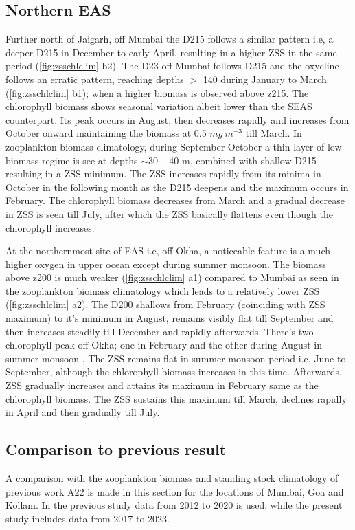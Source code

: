 \documentclass{article}
\begin{document}
	\subsection{Northern EAS}
	Further north of Jaigarh, off Mumbai the D215 follows a similar pattern i.e, a deeper D215 in December to early April, resulting in a higher ZSS in the same period (\cref{fig:zsschlclim} b2). The D23 off Mumbai follows D215 and the oxycline follows an erratic pattern, reaching depths $>$ 140 during January to March (\cref{fig:zsschlclim} b1); when a higher biomass is observed above z215. The chlorophyll biomass shows seasonal variation albeit lower than the SEAS counterpart. Its peak occurs in August, then decreases rapidly and increases from October onward maintaining the biomass at 0.5 $mg\ m^{-3}$ till March. In zooplankton biomass climatology, during September-October a thin layer of low biomass regime is see at depths $\sim$30 -- 40 m, combined with shallow D215 resulting in a ZSS minimum. The ZSS increases rapidly from its minima in October in the following month as the D215 deepens and the maximum occurs in February. The chlorophyll biomass decreases from March and a gradual decrease in ZSS is seen till July, after which the ZSS basically flattens even though the chlorophyll increases. 
	
	At the northernmost site of EAS i.e, off Okha, a noticeable feature is a much higher oxygen in upper ocean except during summer monsoon. The biomass above z200 is much weaker (\cref{fig:zsschlclim} a1) compared to Mumbai as seen in the zooplankton biomass climatology which leads to a relatively lower ZSS (\cref{fig:zsschlclim} a2). The D200 shallows from February (coinciding with ZSS maximum) to it's minimum in August,  remains visibly flat till September and then increases steadily till December and rapidly afterwards. There's two chlorophyll peak off Okha; one in February \citep{keerthi2017physical} and the other during August in summer monsoon \citep{levy2007basin}. The ZSS remains flat in summer monsoon period i.e, June to September, although the chlorophyll biomass increases in this time. Afterwards, ZSS gradually increases and attains its maximum in February same as the chlorophyll biomass. The ZSS sustains this maximum till March, declines rapidly in April and then gradually till July.
	 
	\subsection{Comparison to previous result}	 
	A comparison with the zooplankton biomass and standing stock climatology of previous work A22 is made in this section for the locations of Mumbai, Goa and Kollam. In the previous study data from 2012 to 2020 is used, while the present study includes data from 2017 to 2023.
	
\end{document}

